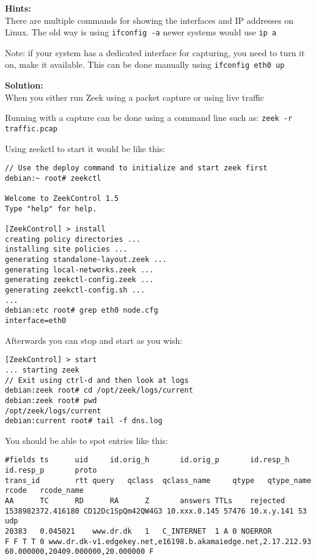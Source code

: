 \documentclass[a4paper,11pt,notitlepage]{report}
\begin{document}
{\bf Hints:}\\
There are multiple commands for showing the interfaces and IP addresses on Linux. The old way is using \verb+ifconfig -a+ newer systems would use \verb+ip a+

Note: if your system has a dedicated interface for capturing, you need to turn it on, make it available. This can be done manually using \verb+ifconfig eth0 up+

{\bf Solution:}\\
When you either run Zeek using a packet capture or using live traffic

Running with a capture can be done using a command line such as:
\verb+zeek -r traffic.pcap+

Using zeekctl to start it would be like this:
\begin{verbatim}
// Use the deploy command to initialize and start zeek first
debian:~ root# zeekctl

Welcome to ZeekControl 1.5
Type "help" for help.

[ZeekControl] > install
creating policy directories ...
installing site policies ...
generating standalone-layout.zeek ...
generating local-networks.zeek ...
generating zeekctl-config.zeek ...
generating zeekctl-config.sh ...
...
debian:etc root# grep eth0 node.cfg
interface=eth0
\end{verbatim}

Afterwards you can stop and start as you wish:
\begin{verbatim}
[ZeekControl] > start
... starting zeek
// Exit using ctrl-d and then look at logs
debian:zeek root# cd /opt/zeek/logs/current
debian:zeek root# pwd
/opt/zeek/logs/current
debian:current root# tail -f dns.log
\end{verbatim}

You should be able to spot entries like this:
\begin{verbatim}
#fields ts      uid     id.orig_h       id.orig_p       id.resp_h       id.resp_p       proto
trans_id        rtt query   qclass  qclass_name     qtype   qtype_name      rcode   rcode_name
AA      TC      RD      RA      Z       answers TTLs    rejected
1538982372.416180 CD12Dc1SpQm42QW4G3 10.xxx.0.145 57476 10.x.y.141 53	udp
20383	0.045021	www.dr.dk	1	C_INTERNET	1 A 0 NOERROR
F F T T 0 www.dr.dk-v1.edgekey.net,e16198.b.akamaiedge.net,2.17.212.93 60.000000,20409.000000,20.000000 F
\end{verbatim}
\end{document}
